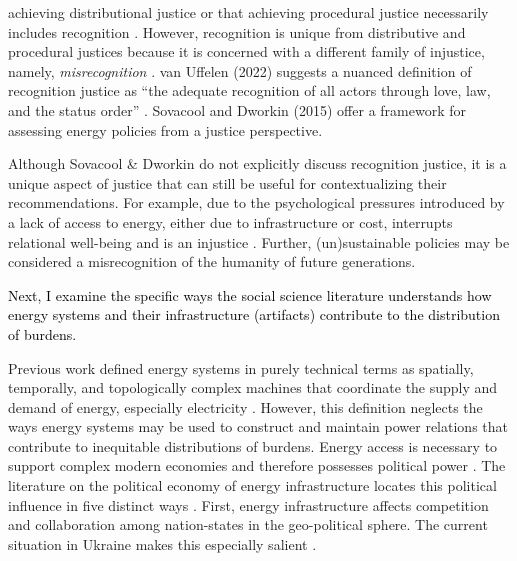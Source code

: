     achieving distributional justice or that achieving procedural justice
    necessarily includes recognition \cite{schlosberg_2_2007}. However,
    recognition is unique from distributive and procedural justices because it
    is concerned with a different family of injustice, namely,
    \textit{misrecognition} \cite{van_uffelen_revisiting_2022}. van Uffelen
    (2022) suggests a nuanced definition of recognition justice as ``the
    adequate recognition of all actors through love, law, and the status order''
    \cite{van_uffelen_revisiting_2022}.
Sovacool and Dworkin (2015) offer a framework for assessing energy policies from
a justice perspective. 

%     

Although Sovacool \& Dworkin do not explicitly discuss recognition justice, it
is a unique aspect of justice that can still be useful for contextualizing their
recommendations. For example, due to the psychological pressures introduced by a
lack of access to energy, either due to infrastructure or cost, interrupts
relational well-being and is an injustice \cite{van_uffelen_revisiting_2022}.
Further, (un)sustainable policies may be considered a misrecognition of the
humanity of future generations.

\textcolor{black}{Next, I examine the specific ways the social science literature understands how energy systems and their infrastructure (artifacts) contribute to the distribution of burdens.}

Previous work defined energy systems in purely technical terms as spatially,
temporally, and topologically complex machines that coordinate the supply and
demand of energy, especially electricity \cite{dotson_influence_2022}. However,
this definition neglects the ways energy systems may be used to construct and
maintain power relations that contribute to inequitable distributions of
burdens. Energy access is necessary to support complex modern economies and
therefore possesses political power \cite{jones_building_2013,
bridge_energy_2018}. The literature on the political economy of energy
infrastructure locates this political influence in five distinct ways
\cite{bridge_energy_2018}. First, energy infrastructure affects competition and
collaboration among nation-states in the geo-political sphere. The current
situation in Ukraine makes this especially salient
\cite{figueiredo_impacts_2022}. 

